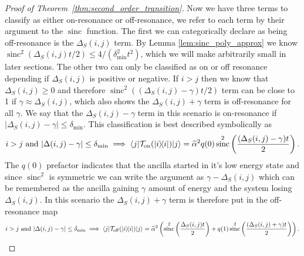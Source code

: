 \documentclass[
 amsmath,amssymb,
 aps,
onecolumn, 
nofootinbib]{revtex4-2}
\newcommand{\on}{\rm on}
\newcommand{\off}{\rm off}
\newcommand{\ket}[1]{|#1\rangle}
\newcommand{\bra}[1]{\langle #1|}
\newcommand{\ketbra}[2]{| #1\rangle\! \langle #2|}
\DeclareMathOperator{\sinc}{sinc}
\begin{document}
\begin{proof}[Proof of Theorem~\ref{thm:second_order_transition}]
    Now we have three terms to classify as either on-resonance or off-resonance, we refer to each term by their argument to the $\sinc$ function. The first we can categorically declare as being off-resonance is the $\Delta_S(i,j)$ term. By Lemma \ref{lem:sinc_poly_approx} we know $\sinc^2(\Delta_S(i,j) t/ 2) \le 4 / (\delta_{\min}^2 t^2)$, which we will make arbitrarily small in later sections. The other two can only be classified as on or off resonance depending if $\Delta_S(i,j)$ is positive or negative. If $i > j$ then we know that $\Delta_S(i,j) \ge 0$ and therefore $\sinc^2((\Delta_S(i,j) - \gamma)t/2)$ term can be close to 1 if $\gamma \approx \Delta_{S}(i,j)$, which also shows the $\Delta_S(i,j) + \gamma$ term is off-resonance for all $\gamma$. We say that the $\Delta_S(i,j) - \gamma$ term in this scenario is on-resonance if $|\Delta_S(i,j) - \gamma| \le \delta_{\min}$. This classification is best described symbolically as
    \begin{equation}
    i > j \text{ and } |\Delta(i,j) - \gamma| \le \delta_{\min} \implies  \bra{j} \mathcal{T}_{\on}(\ketbra{i}{i}) \ket{j} = \widetilde{\alpha}^2 q(0) \sinc^2 \left( \frac{(\Delta_S(i,j) - \gamma)t}{2} \right).\label{eq:on_resonance_i_geq_j}
    \end{equation}
    The $q(0)$ prefactor indicates that the ancilla started in it's low energy state and since $\sinc^2$ is symmetric we can write the argument as $\gamma - \Delta_S(i,j)$ which can be remembered as the ancilla gaining $\gamma$ amount of energy and the system losing $\Delta_S(i,j)$. In this scenario the $\Delta_S(i,j) + \gamma$ term is therefore put in the off-resonance map
    \begin{align}
        i > j \text{ and } |\Delta(i,j) - \gamma| \le \delta_{\min} \implies  \bra{j} \mathcal{T}_{\off}(\ketbra{i}{i}) \ket{j} = \widetilde{\alpha}^2\left( \sinc^2 \left( \frac{\Delta_S(i,j) t}{2} \right) + q(1) \sinc^2 \left(\frac{(\Delta_S(i,j) + \gamma) t}{2} \right) \right).
    \end{align}
    

\end{proof}
\end{document}
